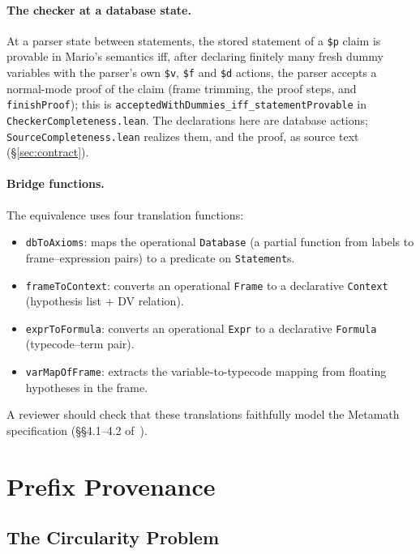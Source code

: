 \documentclass[11pt]{article}
\newcommand{\lean}[1]{\lstinline[language=Lean4]{#1}}
\newcommand{\file}[1]{\texttt{#1}}
\begin{document}
\paragraph{The checker at a database state.}
At a parser state between statements, the stored statement of a
\verb|$p| claim is provable in Mario's semantics iff, after declaring
finitely many fresh dummy variables with the parser's own \verb|$v|,
\verb|$f| and \verb|$d| actions, the parser accepts a normal-mode proof
of the claim (frame trimming, the proof steps, and \lean{finishProof});
this is \lean{acceptedWithDummies_iff_statementProvable} in
\file{CheckerCompleteness.lean}.  The declarations here are database
actions; \file{SourceCompleteness.lean} realizes them, and the proof, as
source text (\S\ref{sec:contract}).

\paragraph{Bridge functions.}
The equivalence uses four translation functions:
\begin{itemize}[leftmargin=2em]
\item \lean{dbToAxioms}: maps the operational \lean{Database} (a partial function
  from labels to frame--expression pairs) to a predicate on \lean{Statement}s.
\item \lean{frameToContext}: converts an operational \lean{Frame} to a
  declarative \lean{Context} (hypothesis list + DV relation).
\item \lean{exprToFormula}: converts an operational \lean{Expr} to a
  declarative \lean{Formula} (typecode--term pair).
\item \lean{varMapOfFrame}: extracts the variable-to-typecode mapping
  from floating hypotheses in the frame.
\end{itemize}

A reviewer should check that these translations faithfully model the
Metamath specification (\S\S4.1--4.2 of~\cite{megill2019}).

\section{Prefix Provenance}
\label{sec:prefix}

\subsection{The Circularity Problem}
\end{document}
